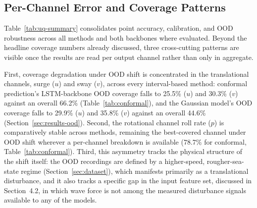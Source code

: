 \documentclass[a4paper,fleqn]{cas-sc}
\begin{document}
\subsection{Per-Channel Error and Coverage Patterns}
\label{sec:results-channels}

Table~\ref{tab:uq-summary} consolidates point accuracy, calibration, and OOD robustness across all methods and both backbones where evaluated. Beyond the headline coverage numbers already discussed, three cross-cutting patterns are visible once the results are read per output channel rather than only in aggregate.

First, coverage degradation under OOD shift is concentrated in the translational channels, surge ($u$) and sway ($v$), across every interval-based method: conformal prediction's LSTM-backbone OOD coverage falls to 25.5\% ($u$) and 30.3\% ($v$) against an overall 66.2\% (Table~\ref{tab:conformal}), and the Gaussian model's OOD coverage falls to 29.9\% ($u$) and 35.8\% ($v$) against an overall 44.6\% (Section~\ref{sec:results-ood}). Second, the rotational channel roll rate ($p$) is comparatively stable across methods, remaining the best-covered channel under OOD shift wherever a per-channel breakdown is available (78.7\% for conformal, Table~\ref{tab:conformal}). Third, this asymmetry tracks the physical structure of the shift itself: the OOD recordings are defined by a higher-speed, rougher-sea-state regime (Section~\ref{sec:dataset}), which manifests primarily as a translational disturbance, and it also tracks a specific gap in the input feature set, discussed in Section~4.2, in which wave force is not among the measured disturbance signals available to any of the models.
\end{document}
